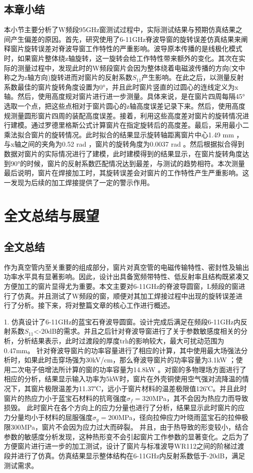 \documentclass[master]{thesis-uestc}
\begin{document}
\section{本章小结}
本小节主要分析了W频段95GHz窗测试过程中，实际测试结果与预期仿真结果之间产生偏差的原因。首先，研究使用了6-11GHz脊波导窗的旋转误差仿真结果来阐释窗片旋转误差对脊波导窗工作特性的严重影响。波导原本传播的是线极化模式时，如果窗片整体绕z轴旋转，这一旋转会给工作特性带来额外的变化。其次在实际的测量过程中，发现此时的W频段窗片会因为整体绕着电磁波传播的方向(文中称之为z轴方向)旋转进而对窗片的反射系数\(S_{11}\)产生影响。在此之后，以测量反射系数最佳的窗片旋转角度设置为0°，并且此时窗片竖直的过圆心的连线定义为x轴。然后，使用高度规对窗片进行进一步测量。具体来说，是在窗片四周每隔45°选取一个点，把这些点相对于窗片圆心的z轴高度误差记录下来。然后，使用高度规测量圆形窗片四周的装配高度误差。接着，利用这些高度差对窗片的旋转情况进行建模。通过罗德里格斯公式计算窗片在指定旋转后的高度差。最后，采用最小二乘法拟合窗片的旋转情况。此时拟合的结果显示旋转轴距离窗片中心1.49 mm ，与x轴之间的夹角为0.52 rad ，窗片的旋转角度为0.0037 rad 。然后根据拟合得到数据对窗片的实际情况进行了建模，此时建模得到的结果显示，在窗片旋转角度达到90°的时候，窗片的反射系数匹配情况达到最差，与测试的趋势相符。本次测量最后说明，窗片在焊接加工时，其旋转误差会对窗片的工作特性产生严重影响。这一发现为后续的加工焊接提供了一定的警示作用。

\chapter{全文总结与展望}

\section{全文总结}
作为真空管内至关重要的组成部分，窗片对真空管的电磁传输特性、密封性及输出功率水平具有显著影响。因此，设计出具备宽频带特性、低反射率且结构既紧凑又方便加工的窗片显得尤为重要。本文主要对6-11GHz的脊波导圆窗，L频段的窗进行了仿真。并且测试了W频段的窗，顺便对其加工焊接过程中出现的旋转误差进行了分析。接下来，将对整篇文章的核心工作进行概述。

1. 仿真设计了6-11GHz的蓝宝石脊波导圆窗。设计完成后满足在频段6-11GHz内反射系数\(S_{11}\)<-20dB的需求。并且之后针对脊波导窗进行了关于参数敏感度相关的分析，分析结果表示，此时过渡段的厚度trh的影响较大，最大可扰动范围为0.47mm。
针对脊波导窗片的功率容量进行了相应的计算，其中使用最大场强法分析时，如果此时击穿场强为30kV/cm，那么脊波导窗片的功率容量为3.1kW ；使用二次电子倍增法所计算的窗的功率容量为14.8kW 。对窗的多物理场方面进行了相应的分析，结果显示输入功率为5kW时，窗片在外壳铜使用空气强对流降温的情况下，其窗片极限温差为11.37℃，远小于窗片材料的温差极限值126℃。并且此时窗片的热应力小于蓝宝石材料的抗弯强度\(\sigma_f = 320\)MPa，其不会因为热应力而导致损毁。
此时窗片在各个方向上的应力分量也进行了分析，结果显示此时窗片的应力分量均小于材料的屈服强度\(\sigma_y = 200\)MPa，径向拉伸应力叶晓雨蓝宝石的拉伸极限300MPa，窗片不会因为应力过大而碎裂。
并且，由于热导致的形变较小，结合参数的敏感度分析发现，这种热形变不会引起窗片工作参数的显著变化。之后为了方便窗片进行进一步的加工测试，设计了窗片与标准波导WR112之间的阶梯过渡段并进行了仿真。仿真结果显示整体结构在6-11GHz内反射系数低于-20dB，满足测试需求。
\end{document}
